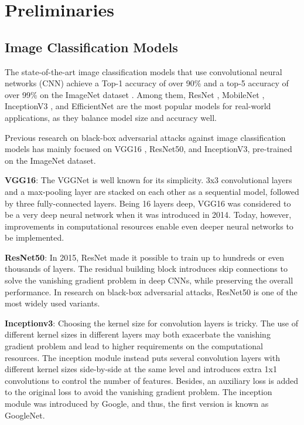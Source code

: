 \section{Preliminaries}

\subsection{Image Classification Models}

The state-of-the-art image classification models that use convolutional neural networks (CNN) achieve a Top-1 accuracy of over 90\% and a top-5 accuracy of over 99\% on the ImageNet dataset \citep{pham2021meta}. Among them, ResNet \citep{he2016deep}, MobileNet \citep{howard2017mobilenets}, InceptionV3 \citep{szegedy2016rethinking}, and EfficientNet \citep{tan2019efficientnet} are the most popular models for real-world applications, as they balance model size and accuracy well. 

Previous research on black-box adversarial attacks against image classification models has mainly focused on VGG16 \citep{simonyan2014very}, ResNet50, and InceptionV3, pre-trained on the ImageNet \citep{russakovsky2015imagenet} dataset.

\textbf{VGG16}: The VGGNet is well known for its simplicity. 3x3 convolutional layers and a max-pooling layer are stacked on each other as a sequential model, followed by three fully-connected layers. Being 16 layers deep, VGG16 was considered to be a very deep neural network when it was introduced in 2014. Today, however, improvements in computational resources enable even deeper neural networks to be implemented.

\textbf{ResNet50}: In 2015, ResNet made it possible to train up to hundreds or even thousands of layers. The residual building block introduces skip connections to solve the vanishing gradient problem in deep CNNs, while preserving the overall performance. In research on black-box adversarial attacks, ResNet50 is one of the most widely used variants.

\textbf{Inceptionv3}: Choosing the kernel size for convolution layers is tricky. The use of different kernel sizes in different layers may both exacerbate the vanishing gradient problem and lead to higher requirements on the computational resources. The inception module instead puts several convolution layers with different kernel sizes side-by-side at the same level and introduces extra 1x1 convolutions to control the number of features. Besides, an auxiliary loss is added to the original loss to avoid the vanishing gradient problem. The inception module was introduced by Google, and thus, the first version is known as GoogleNet.

